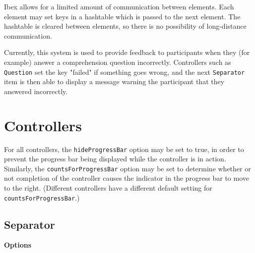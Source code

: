 \documentclass[
]{article}
\begin{document}
Ibex allows for a limited amount of communication between elements. Each
element may set keys in a hashtable which is passed to the next element.
The hashtable is cleared between elements, so there is no possibility of
long-distance communication.

Currently, this system is used to provide feedback to participants when
they (for example) answer a comprehension question incorrectly.
Controllers such as \texttt{Question} set the key "failed" if something
goes wrong, and the next \texttt{Separator} item is then able to display
a message warning the participant that they answered incorrectly.

\hypertarget{controllers}{%
\section{Controllers}\label{controllers}}

For all controllers, the \texttt{hideProgressBar} option may be set to
true, in order to prevent the progress bar being displayed while the
controller is in action. Similarly, the \texttt{countsForProgressBar}
option may be set to determine whether or not completion of the
controller causes the indicator in the progress bar to move to the
right. (Different controllers have a different default setting for
\texttt{countsForProgressBar}.)

\hypertarget{separator}{%
\subsection{Separator}\label{separator}}

\textbf{Options}
\end{document}
